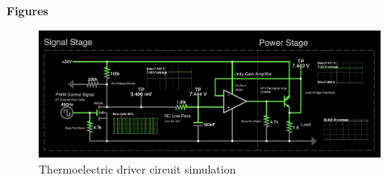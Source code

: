 \clearpage

\textbf{Figures}

\begin{figure}[h!]
  \centering
  \includegraphics[width=\textwidth]{../assets/figures/airthermoregulation_simulation.png}
  \hfill
  \caption{Thermoelectric driver circuit simulation \cite{thermo-falstad}}
  \label{fig:peltierdriver}
\end{figure}

